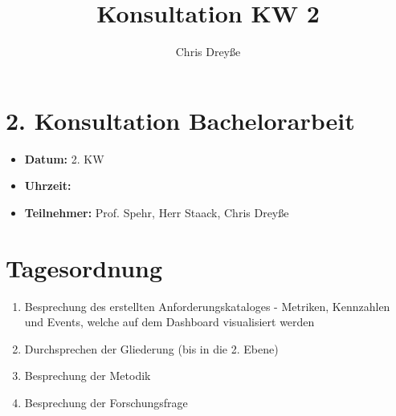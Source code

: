 \documentclass[a4paper,12pt]{article}
\title{Konsultation KW 2 }
\author{Chris Dreyße}
\date{}
\begin{document}
\maketitle

\section*{2. Konsultation Bachelorarbeit}
\begin{itemize}[label={}]
    \item \textbf{Datum:} 2. KW
    \item \textbf{Uhrzeit:} 
    \item \textbf{Teilnehmer:} Prof. Spehr, Herr Staack, Chris Dreyße
\end{itemize}

\section*{Tagesordnung}
\begin{enumerate}
    \item Besprechung des erstellten Anforderungskataloges - Metriken, Kennzahlen und Events, welche auf dem Dashboard visualisiert werden
    \item Durchsprechen der Gliederung (bis in die 2. Ebene)
    \item Besprechung der Metodik 
    \item Besprechung der Forschungsfrage
\end{enumerate}



\end{document}
